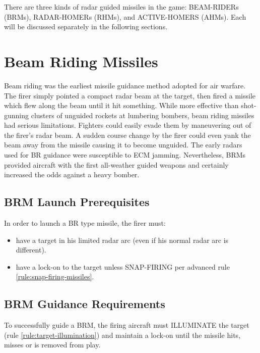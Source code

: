 
\label{rule:radar-guided-missiles}

There are three kinds of radar guided missiles in the game: BEAM-RIDERs (BRMs), RADAR-HOMERs (RHMs), and ACTIVE-HOMERS (AHMs). Each will be discussed separately in the following sections.

\section{Beam Riding Missiles}
\label{rule:beam-riding-missiles}

Beam riding was the earliest missile guidance method adopted for air warfare. The firer simply pointed a compact radar beam at the target, then fired a missile which flew along the beam until it hit something. While more effective than shot-gunning clusters of unguided rockets at lumbering bombers, beam riding missiles had serious limitations. Fighters could easily evade them by maneuvering out of the firer's radar beam. A sudden course change by the firer could even yank the beam away from the missile causing it to become unguided. The early radars used for BR guidance were susceptible to ECM jamming. Nevertheless, BRMs provided aircraft with the first all-weather guided weapons and certainly increased the odds against a heavy bomber.

\subsection{BRM Launch Prerequisites}\label{rule:brm-launch-requirements} In order to launch a BR type missile, the firer must:

\begin{itemize}

    \item have a target in his limited radar arc (even if his normal radar arc is different).

    \item have a lock-on to the target unless SNAP-FIRING per advanced rule \ref{rule:snap-firing-missiles}.

\end{itemize}

\subsection{BRM Guidance Requirements} To successfully guide a BRM, the firing aircraft must ILLUMINATE the target (rule \ref{rule:target-illumination}) and maintain a lock-on until the missile hits, misses or is removed from play.

